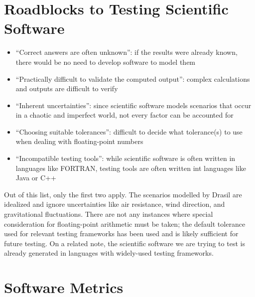 \section{Roadblocks to Testing Scientific Software
  \cite[p.~67]{kanewala_metamorphic_2019}}
\label{chap:notes:sec:sci-testing-roadblocks}
\begin{itemize}
      \item ``Correct answers are often unknown'': if the results were already
            known, there would be no need to develop software to model them
            \cite[p.~67]{kanewala_metamorphic_2019}
      \item ``Practically difficult to validate the computed output'': complex
            calculations and outputs are difficult to verify
            \cite[p.~67]{kanewala_metamorphic_2019}
      \item ``Inherent uncertainties'': since scientific software models
            scenarios that occur in a chaotic and imperfect world, not every
            factor can be accounted for \cite[p.~67]{kanewala_metamorphic_2019}
      \item ``Choosing suitable tolerances'': difficult to decide what
            tolerance(s) to use when dealing with floating-point numbers
            \cite[p.~67]{kanewala_metamorphic_2019}
      \item ``Incompatible testing tools'': while scientific software is often
            written in languages like FORTRAN, testing tools are often written
            int languages like Java or C++ \cite[p.~67]{kanewala_metamorphic_2019}
\end{itemize}

Out of this list, only the first two apply. The scenarios modelled by Drasil
are idealized and ignore uncertainties like air resistance, wind direction,
and gravitational fluctuations. There are not any instances where special
consideration for floating-point arithmetic must be taken; the default
tolerance used for relevant testing frameworks has been used
 and is likely sufficient for future testing. On a related
note, the scientific software we are trying to test is already generated in
languages with widely-used testing frameworks. 

\section{Software Metrics}
\label{chap:notes:sec:software-metrics}

